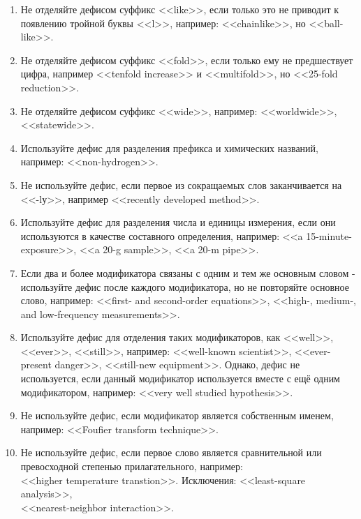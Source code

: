 \documentclass[a5paper, 10pt, twoside, numbers=enddot]{scrartcl}
\begin{document}
\begin{enumerate}
\begin{enumerate}
    \item Не отделяйте дефисом суффикс <<like>>, если только это не приводит к появлению тройной буквы <<l>>, например: <<chainlike>>, но <<ball-like>>.
    
    \item Не отделяйте дефисом суффикс <<fold>>, если только ему не предшествует цифра, например <<tenfold increase>> и <<multifold>>, но <<25-fold reduction>>.
    
    \item Не отделяйте дефисом суффикс <<wide>>, например: <<worldwide>>,\\ <<statewide>>.
    
    \item Используйте дефис для разделения префикса и химических названий, например: <<non-hydrogen>>.
    
    \item Не используйте дефис, если первое из сокращаемых слов заканчивается на <<-lу>>, например <<recently developed method>>.
    
    \item Используйте дефис для разделения числа и единицы измерения, если они используются в качестве составного определения, например: <<a 15-minute-exposure>>, <<a 20-g sample>>, <<a 20-m pipe>>.

    \item Если два и более модификатора связаны с одним и тем же основным словом - используйте дефис после каждого модификатора, но не повторяйте основное слово, например: <<first- and second-order equations>>, <<high-, medium-, and low-frequency measurements>>.

    \item Используйте дефис для отделения таких модификаторов, как <<well>>, <<ever>>, <<still>>, например: <<well-known scientist>>, <<ever-present danger>>, <<still-new equipment>>. Однако, дефис не используется, если данный модификатор  используется вместе с ещё одним модификатором, например: <<very well studied hypothesis>>.

    \item Не используйте дефис, если модификатор является собственным именем, например: <<Foufier transform technique>>.

    \item Не используйте дефис, если первое слово является сравнительной или превосходной степенью прилагательного, например:\\ <<higher temperature transtion>>. Исключения: <<least-square analysis>>,\\ <<nearest-neighbor interaction>>.


\end{enumerate}
\end{enumerate}
\end{document}
